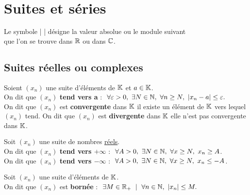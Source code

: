 
\section{Suites et séries}

\vspace{1cm}

\begin{center}
    Le symbole | | désigne la valeur absolue ou le module suivant\\
    que l'on se trouve dans \(\mathbb{R}\) ou dans \(\mathbb{C}\).
\end{center}

\vspace{0.5cm}

\subsection{Suites réelles ou complexes}

\vspace{1.3cm}

\hspace{0.5cm} Soient \((x_n)\) une suite d'éléments de $\mathbb{K}$ et \(a\in \mathbb{K}\).\\
On dit que $(x_n)$ \textbf{tend vers a} \ssi :\(\ \ \forall \varepsilon >0,\ \exists N\in \mathbb{N},\ \forall n\geq N,\ |x_n-a|\leq \varepsilon. \)\vspace{0.3cm}\\
On dit que $(x_n)$ est \textbf{convergente} dans $\mathbb{K}$ \ssi il existe un élément de $\mathbb{K}$ vers lequel $(x_n)$ tend. On dit que $(x_n)$ est \textbf{divergente} dans $\mathbb{K}$ \ssi elle n'est pas convergente dans $\mathbb{K}$.

\vspace{1.3cm}

Soit $(x_n)$ une suite de nombres \underline{réels}.\\
On dit que $(x_n)$ \textbf{tend vers $+\infty$} \ssi :\(\ \ \forall A>0,\ \exists N\in \NN,\ \forall x\geq N,\ x_n\geq A\).\vspace{0.1cm}\\
On dit que $(x_n)$ \textbf{tend vers $-\infty$} \ssi :\(\ \ \forall A>0,\ \exists N\in \NN,\ \forall x\geq N,\ x_n\leq -A\).

\vspace{1.2cm}

Soit $(x_n)$ une suite d'éléments de $\mathbb{K}$.\\
On dit que $(x_n)$ est \textbf{bornée} \ssi : \(\ \exists M\in \mathbb{R}_+ \ \mid \ \forall n\in \mathbb{N},\ |x_n|\leq M. \)


